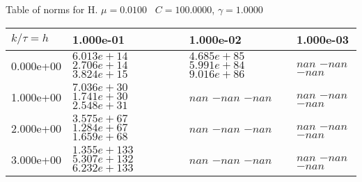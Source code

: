 \begin{center}
Table of norms for H. $\mu = 0.0100$ \, $C = 100.0000$, $\gamma = 1.0000$
  
\begin{tabular}{|p{1in}|p{1in}|p{1in}|p{1in}|} \hline
$k / \tau = h$ &1.000e-01 &1.000e-02 &1.000e-03 \\ \hline 
0.000e+00 & $6.013e+14$  $2.706e+14$  $3.824e+15$  & $4.685e+85$  $5.991e+84$  $9.016e+86$  & $nan$  $-nan$  $-nan$  \\ \hline 
1.000e+00 & $7.036e+30$  $1.741e+30$  $2.548e+31$  & $nan$  $-nan$  $-nan$  & $nan$  $-nan$  $-nan$  \\ \hline 
2.000e+00 & $3.575e+67$  $1.284e+67$  $1.659e+68$  & $nan$  $-nan$  $-nan$  & $nan$  $-nan$  $-nan$  \\ \hline 
3.000e+00 & $1.355e+133$  $5.307e+132$  $6.232e+133$  & $nan$  $-nan$  $-nan$  & $nan$  $-nan$  $-nan$  \\ \hline 

\end{tabular}\\[20pt]
\end{center}
